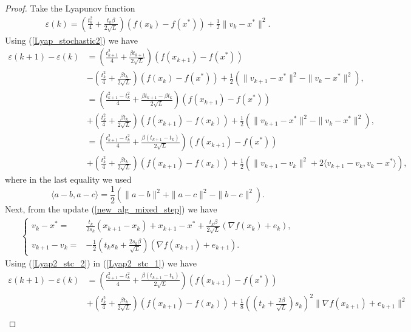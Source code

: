 \documentclass{article}
\theoremstyle{plain}
\theoremstyle{definition}
\theoremstyle{remark}
\begin{document}
\begin{proof}
 Take the Lyapunov function
    \begin{align}\label{Lyap_stochastic2}
    \varepsilon(k)= (\frac{t_k^2}{4}+\frac{t_k\beta}{2\sqrt{L}})(f(x_k)-f(x^*))+\frac{1}{2}\|v_k-x^*\|^2.
    \end{align}
     Using (\ref{Lyap_stochastic2}) we have
    \begin{align}\label{Lyap2_stc_1}
        \varepsilon(k+1)-\varepsilon(k)&=(\frac{t_{k+1}^2}{4}+\frac{\beta t_{k+1}}{2\sqrt{L}})(f(x_{k+1})-f(x^*))\nonumber\\
        &-(\frac{t_{k}^2}{4}+\frac{\beta t_{k}}{2\sqrt{L}})(f(x_{k})-f(x^*))+\frac{1}{2}(\|v_{k+1}-x^*\|^2-\|v_{k}-x^*\|^2),\nonumber\\
        & = (\frac{t_{k+1}^2-t_k^2}{4}+\frac{\beta t_{k+1}-\beta t_k}{2\sqrt{L}})(f(x_{k+1})-f(x^*))\nonumber\\
        &+(\frac{t_{k}^2}{4}+\frac{\beta t_{k}}{2\sqrt{L}})(f(x_{k+1})-f(x_k))+\frac{1}{2}(\|v_{k+1}-x^*\|^2-\|v_{k}-x^*\|^2),\nonumber\\
        &= (\frac{t_{k+1}^2-t_k^2}{4}+\frac{\beta(t_{k+1}-t_k)}{2\sqrt{L}})(f(x_{k+1})-f(x^*))\nonumber\\
        &+(\frac{t_{k}^2}{4}+\frac{\beta t_{k}}{2\sqrt{L}})(f(x_{k+1})-f(x_k))+\frac{1}{2}(\|v_{k+1}-v_k\|^2+2\langle v_{k+1}-v_k,v_k-x^*\rangle),
    \end{align}
    where in the last equality we used 
    $$\langle a-b,a-c\rangle = \frac{1}{2}(\|a-b\|^2+\|a-c\|^2-\|b-c\|^2).$$
    Next, from the update (\ref{new_alg_mixed_step}) we have
    \begin{align}\label{Lyap2_stc_2}
        \left\{\begin{array}{cl}
             v_k-x^*=&\frac{t_k}{2s_k}(x_{k+1}-x_k)+x_{k+1}-x^*+\frac{t_k\beta }{2\sqrt{L}}(\nabla f(x_k)+e_k),  \\
            v_{k+1}-v_k=& -\frac{1}{2}(t_ks_k+\tfrac{2s_k\beta}{\sqrt{L}}) (\nabla f(x_{k+1})+e_{k+1}).
        \end{array}\right.
    \end{align}
    Using (\ref{Lyap2_stc_2}) in (\ref{Lyap2_stc_1}) we have
    \begin{align}\label{Lyap_stc_3}
        \varepsilon(k+1)-\varepsilon(k)&=(\frac{t_{k+1}^2-t_k^2}{4}+\frac{\beta(t_{k+1}-t_k)}{2\sqrt{L}})(f(x_{k+1})-f(x^*))\nonumber\\
        &+(\frac{t_{k}^2}{4}+\frac{\beta t_{k}}{2\sqrt{L}})(f(x_{k+1})-f(x_k))+\frac{1}{8}((t_k+\frac{2\beta}{\sqrt{L}})s_k)^2\|\nabla f(x_{k+1})+e_{k+1}\|^2\nonumber\\

\end{align}
\end{proof}
\end{document}
